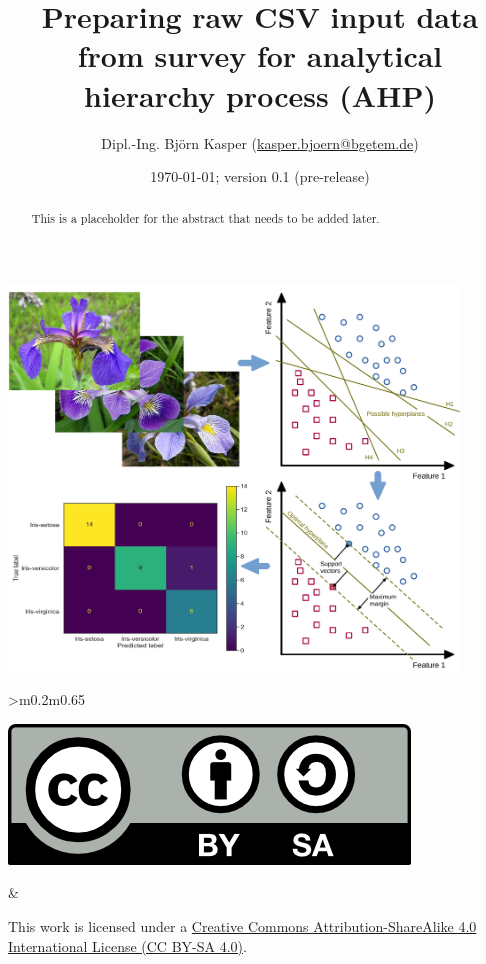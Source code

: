 \documentclass [oneside,10pt,a4paper,ngerman,BCOR10mm,headsepline,parindent,final]{scrartcl}
\title{\textbf{\textsf{Preparing raw CSV input data from survey for analytical hierarchy process (AHP)}}}\author{Dipl.-Ing. Bj\"orn Kasper (\href{mailto:kasper.bjoern@bgetem.de}{kasper.bjoern@bgetem.de})}\affil{BG ETEM}\date{\today; version 0.1 (pre-release)}
\begin{document}
    
    \pagestyle{empty}
    
    \maketitle\thispagestyle{empty}\begin{center}
        \includegraphics[width=0.90\textwidth]{images/Cover_image.pdf}
        \end{center}
        \vfill

    \begin{abstract}
    This is a placeholder for the abstract that needs to be added later.
    \end{abstract}
    \vfill
    
    \noindent
    \begin{center}
	    \begin{tabular}{>{\centering}m{0.2\textwidth}m{0.65\textwidth}}
	    \begin{minipage}{\linewidth}
	        \includegraphics{images/CC_BY-SA_40.png}
	    \end{minipage}
	    &
	    \begin{minipage}{\linewidth}
	        This work is licensed under a \href{https://creativecommons.org/licenses/by-sa/4.0/}{Creative Commons Attribution-ShareAlike 4.0 International License (CC BY-SA 4.0)}.
	    \end{minipage}
	    \end{tabular}
	\end{center}
\end{document}

